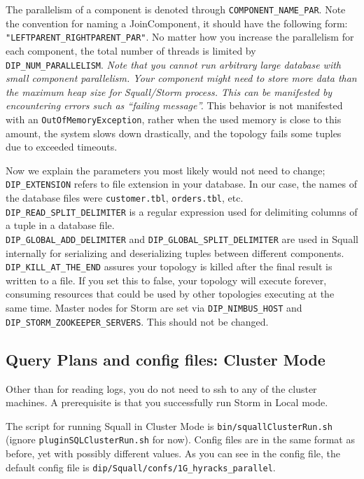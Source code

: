 \documentclass[a4paper,10pt]{article}
\begin{document}
The parallelism of a component is denoted through \verb|COMPONENT_NAME_PAR|. Note the convention for naming a JoinComponent, it should have the following form: \\ \verb|"LEFTPARENT_RIGHTPARENT_PAR"|. No matter how you increase the parallelism for each component, the total number of threads is limited by \\ \verb|DIP_NUM_PARALLELISM|. \textit{Note that you cannot run arbitrary large database with small component parallelism. Your component might need to store more data than the maximum heap size for Squall/Storm process. This can be manifested by encountering errors such as ``failing message''.} This behavior is not manifested with an \verb|OutOfMemoryException|, rather when the used memory is close to this amount, the system slows down drastically, and the topology fails some tuples due to exceeded timeouts.

Now we explain the parameters you most likely would not need to change; \\ \verb|DIP_EXTENSION| refers to file extension in your database. In our case, the names of the database files were \verb|customer.tbl|, \verb|orders.tbl|, etc. \\ \verb|DIP_READ_SPLIT_DELIMITER| is a regular expression used for delimiting columns of a tuple in a database file. \\ \verb|DIP_GLOBAL_ADD_DELIMITER| and \verb|DIP_GLOBAL_SPLIT_DELIMITER| are used in Squall internally for serializing and deserializing tuples between different components. \verb|DIP_KILL_AT_THE_END| assures your topology is killed after the final result is written to a file. If you set this to false, your topology will execute forever, consuming resources that could be used by other topologies executing at the same time. Master nodes for Storm are set via \verb|DIP_NIMBUS_HOST| and \verb|DIP_STORM_ZOOKEEPER_SERVERS|. This should not be changed.

\subsection{Query Plans and config files: Cluster Mode}
Other than for reading logs, you do not need to ssh to any of the cluster machines. A prerequisite is that you successfully run Storm in Local mode.

The script for running Squall in Cluster Mode is \verb#bin/squallClusterRun.sh# (ignore \verb#pluginSQLClusterRun.sh# for now). Config files are in the same format as before, yet with possibly different values. As you can see in the config file, the default config file is \verb#dip/Squall/confs/1G_hyracks_parallel#. 
\end{document}
